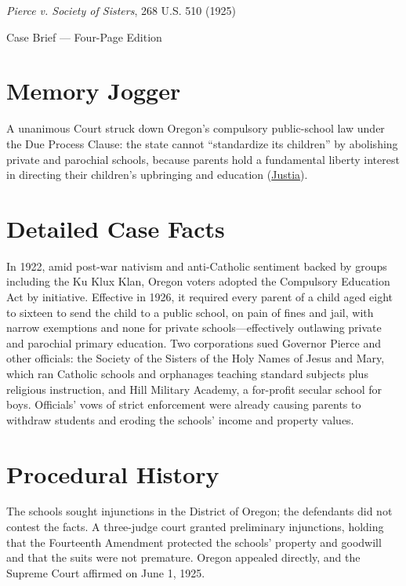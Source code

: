 \documentclass[12pt]{article}
\begin{document}
\begin{center}
{\LARGE \textit{Pierce v. Society of Sisters}, 268 U.S. 510 (1925)\par}
\vspace{0.8em}
{\large Case Brief --- Four-Page Edition\par}
\end{center}
\vspace{1em}

\section{Memory Jogger}

A unanimous Court struck down Oregon's compulsory public-school law under the Due Process Clause: the state cannot ``standardize its children'' by abolishing private and parochial schools, because parents hold a fundamental liberty interest in directing their children's upbringing and education (\href{https://supreme.justia.com/cases/federal/us/268/510/}{Justia}).

\section{Detailed Case Facts}

In 1922, amid post-war nativism and anti-Catholic sentiment backed by groups including the Ku Klux Klan, Oregon voters adopted the Compulsory Education Act by initiative. Effective in 1926, it required every parent of a child aged eight to sixteen to send the child to a public school, on pain of fines and jail, with narrow exemptions and none for private schools---effectively outlawing private and parochial primary education. Two corporations sued Governor Pierce and other officials: the Society of the Sisters of the Holy Names of Jesus and Mary, which ran Catholic schools and orphanages teaching standard subjects plus religious instruction, and Hill Military Academy, a for-profit secular school for boys. Officials' vows of strict enforcement were already causing parents to withdraw students and eroding the schools' income and property values.

\section{Procedural History}

The schools sought injunctions in the District of Oregon; the defendants did not contest the facts. A three-judge court granted preliminary injunctions, holding that the Fourteenth Amendment protected the schools' property and goodwill and that the suits were not premature. Oregon appealed directly, and the Supreme Court affirmed on June 1, 1925.
\end{document}
